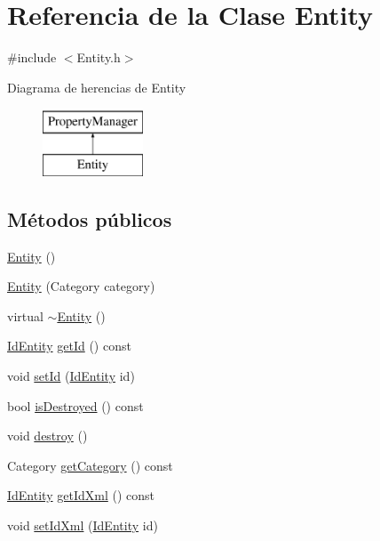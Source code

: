 \hypertarget{classEntity}{}\section{Referencia de la Clase Entity}
\label{classEntity}


{\ttfamily \#include $<$Entity.\+h$>$}

Diagrama de herencias de Entity\begin{figure}[H]
\begin{center}
\leavevmode
\includegraphics[height=2.000000cm]{classEntity}
\end{center}
\end{figure}
\subsection*{Métodos públicos}
\begin{DoxyCompactItemize}
\item 
\hyperlink{classEntity_a980f368aa07ce358583982821533a54a}{Entity} ()
\item 
\hyperlink{classEntity_ac015820cb62dac62532f4cff9e26374f}{Entity} (Category category)
\item 
virtual \hyperlink{classEntity_adf6d3f7cb1b2ba029b6b048a395cc8ae}{$\sim$\+Entity} ()
\item 
\hyperlink{classIdEntity}{Id\+Entity} \hyperlink{classEntity_afd7171167e43dab38b9b75f462fe234c}{get\+Id} () const 
\item 
void \hyperlink{classEntity_a8b7e893af5016e5ebff312abb6e7bbc0}{set\+Id} (\hyperlink{classIdEntity}{Id\+Entity} id)
\item 
bool \hyperlink{classEntity_a3c86039d4c16de3490b52a8595440f47}{is\+Destroyed} () const 
\item 
void \hyperlink{classEntity_a691dbe5f9ec930c27af2af0b97907a9e}{destroy} ()
\item 
Category \hyperlink{classEntity_a93708c98b4a7578b11b8c4f821484199}{get\+Category} () const 
\item 
\hyperlink{classIdEntity}{Id\+Entity} \hyperlink{classEntity_a9067f2ccad4931dc2a5b5dda1ce5180d}{get\+Id\+Xml} () const 
\item 
void \hyperlink{classEntity_abcc6d21fdca8f750c67a638cd1b32537}{set\+Id\+Xml} (\hyperlink{classIdEntity}{Id\+Entity} id)
\end{DoxyCompactItemize}


